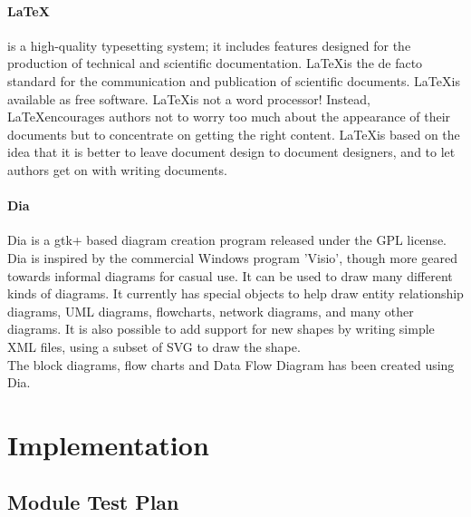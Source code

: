 \documentclass[a4paper,10pt]{iesreport}
\begin{document}
\paragraph*{\LaTeX}
is a high-quality typesetting system; it includes features designed for the production of technical and scientific documentation. \LaTeX   is the de facto standard for the communication and publication of scientific documents. \LaTeX is available as free software.
\LaTeX    is not a word processor! Instead, \LaTeX encourages authors not to worry too much about the appearance of their documents but to concentrate on getting the right content.
\LaTeX is based on the idea that it is better to leave document design to document designers, and to let authors get on with writing documents.

\paragraph*{Dia}
Dia is a gtk+ based diagram creation program released under the GPL license.
\\
Dia is inspired by the commercial Windows program 'Visio', though more geared towards informal diagrams for casual use. It can be used to draw many different kinds of diagrams. It currently has special objects to help draw entity relationship diagrams, UML diagrams, flowcharts, network diagrams, and many other diagrams. It is also possible to add support for new shapes by writing simple XML files, using a subset of SVG to draw the shape.
\\
The block diagrams, flow charts and Data Flow Diagram has been created using Dia.

\newpage

\label{imple}
\section{Implementation}
\subsection{Module Test Plan}
\end{document}
